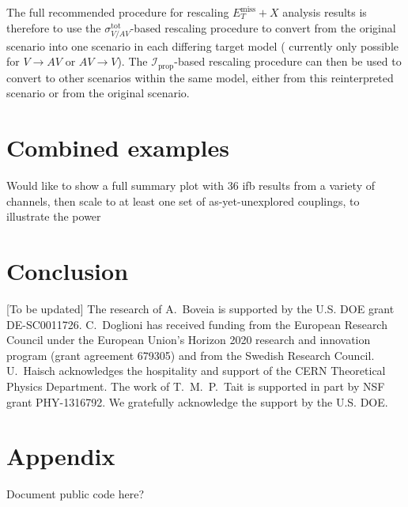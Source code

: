 \documentclass[a4paper, 11pt,notoc]{article}
\newcommand{\MET}{\ensuremath{E_T^\mathrm{miss}}\xspace}
\newcommand{\metplusx}{\ensuremath{\MET+X}\xspace}
\begin{document}
The full recommended procedure for rescaling \metplusx analysis results is therefore to use the $\sigma_{V/AV}^{\text{tot}}$-based rescaling procedure to convert from the original scenario into one scenario in each differing target model ({\color{red} currently only possible for $V\rightarrow AV$ or $AV\rightarrow V$}). The $\mathcal{I}_{\text{prop}}$-based rescaling procedure can then be used to convert to other scenarios within the same model, either from this reinterpreted scenario or from the original scenario.

\section{Combined examples}

Would like to show a full summary plot with 36 ifb results from a variety of channels, then scale to at least one set of as-yet-unexplored couplings, to illustrate the power

\section{Conclusion}



\acknowledgments 

[To be updated] The research of A.~Boveia is supported by the U.S. DOE grant  DE-SC0011726. C.~Doglioni has received funding from the European Research Council under the European Union's Horizon 2020 research and innovation program (grant agreement 679305) and from the Swedish Research Council. U.~Haisch acknowledges the hospitality and support of the CERN Theoretical Physics Department. The work of T.~M.~P.~Tait is supported in part by NSF grant PHY-1316792. We gratefully acknowledge the support by the U.S. DOE. 


\appendix

\section{Appendix}
\label{app:recast}

Document public code here?

\newpage 



\end{document}
